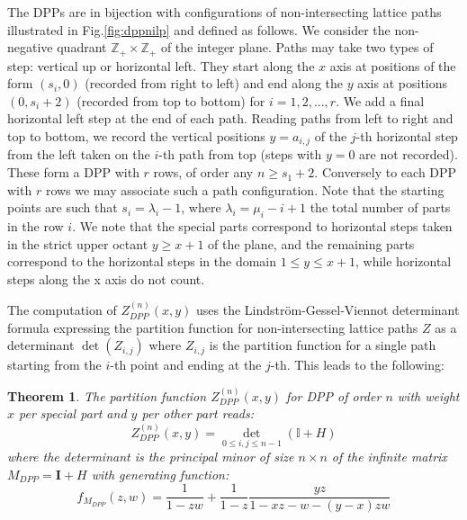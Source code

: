\documentclass[12pt]{amsart}
\newtheorem{thm}{Theorem}[section]
\numberwithin{equation}{section}
\begin{document}
The DPPs are in bijection with configurations of non-intersecting lattice paths illustrated in Fig.\ref{fig:dppnilp}
and defined as follows. We consider the non-negative
quadrant ${{\mathbb Z}}_+\times {{\mathbb Z}}_+$ of the integer plane. Paths may take two types of step: vertical up or horizontal left.
They start along the $x$ axis at positions of the form $(s_i,0)$ (recorded from right to left) 
and end along the $y$ axis at positions $(0,s_i+2)$ (recorded from top to bottom)
for $i=1,2,...,r$. We add a final horizontal left step at the end of each path. Reading paths from left to right 
and top to bottom, we record the vertical positions $y=a_{i,j}$ of the $j$-th horizontal step from 
the left taken on the $i$-th path from top (steps with $y=0$ are not recorded). 
These form a DPP with $r$ rows, of order any $n\geq s_1+2$. 
Conversely to each DPP with $r$ rows we may associate such
a path configuration. Note that the starting points are such that $s_i=\lambda_i-1$, where 
$\lambda_i=\mu_i-i+1$ the total number of parts in the row $i$. We note that the special parts correspond to horizontal steps 
taken in the strict upper octant $y\geq x+1$ of the plane, and the remaining parts correspond 
to the horizontal steps in the domain $1\leq y\leq x+1$,
while horizontal steps along the x axis do not count.

The computation of $Z_{DPP}^{(n)}(x,y)$ uses the Lindstr\"om-Gessel-Viennot \cite{LGV1,LGV2} determinant formula
expressing the partition function for non-intersecting lattice paths $Z$ as a determinant $\det(Z_{i,j})$
where $Z_{i,j}$ is the partition function for a single path starting from the $i$-th point and ending at the $j$-th.
This leads to the following:

\begin{thm}\cite{BDZJ1}\label{dppthm}
The partition function $Z_{DPP}^{(n)}(x,y)$ for DPP of order $n$
with weight $x$ per special part and $y$ per other part reads:
\begin{equation}\label{dppdet}
Z_{DPP}^{(n)}(x,y)= \det_{0\leq i,j \leq n-1} \left( {\mathbb I} + H\right)
\end{equation}
where the determinant is the principal minor of size $n\times n$ of the infinite matrix $M_{DPP}={\mathbf I}+H$
with generating function:
\begin{equation}\label{fdpp} f_{M_{DPP}}(z,w)= \frac{1}{1-z w}+\frac{1}{1-z}\frac{y z}{1-x z-w -(y-x) z w}
\end{equation}
\end{thm}
\end{document}
